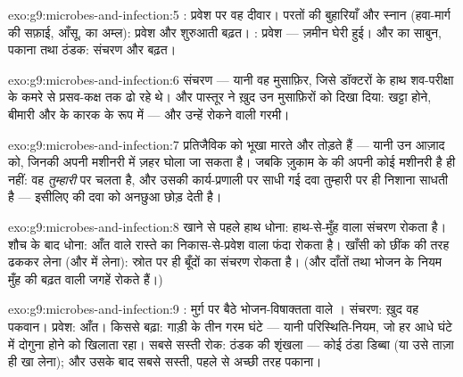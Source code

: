 \begin{solution}{exo:g9:microbes-and-infection:5}
: प्रवेश पर वह दीवार। परतों की बुहारियाँ और स्नान (हवा-मार्ग की
सफ़ाई, आँसू,  का अम्ल): प्रवेश और शुरुआती बढ़त। : प्रवेश --- ज़मीन घेरी हुई। और  का साबुन, पकाना तथा
ठंडक: संचरण और बढ़त।
\end{solution}

\begin{solution}{exo:g9:microbes-and-infection:6}
संचरण --- यानी वह मुसाफ़िर, जिसे डॉक्टरों के हाथ शव-परीक्षा के कमरे से
प्रसव-कक्ष तक ढो रहे थे। और पास्तूर ने ख़ुद उन मुसाफ़िरों को दिखा दिया:
खट्टा होने, बीमारी और  के कारक के रूप में  --- और
उन्हें रोकने वाली गरमी।
\end{solution}

\begin{solution}{exo:g9:microbes-and-infection:7}
प्रतिजैविक  को भूखा मारते और तोड़ते हैं --- यानी उन आज़ाद
 को, जिनकी अपनी मशीनरी में ज़हर घोला जा सकता है। जबकि ज़ुकाम के
 की अपनी कोई मशीनरी है ही नहीं: वह \emph{तुम्हारी} पर चलता है, और
उसकी कार्य-प्रणाली पर साधी गई दवा तुम्हारी  पर ही निशाना साधती
है --- इसीलिए  की दवा  को अनछुआ छोड़ देती है।
\end{solution}

\begin{solution}{exo:g9:microbes-and-infection:8}
खाने से पहले हाथ धोना: हाथ-से-मुँह वाला संचरण रोकता है। शौच के बाद धोना:
आँत वाले रास्ते का निकास-से-प्रवेश वाला फंदा रोकता है। खाँसी को छींक की
तरह ढककर लेना (और  में लेना): स्रोत पर ही बूँदों का संचरण रोकता
है। (और दाँतों तथा भोजन के नियम मुँह की बढ़त वाली जगहें रोकते हैं।)
\end{solution}

\begin{solution}{exo:g9:microbes-and-infection:9}
: मुर्ग़ पर बैठे भोजन-विषाक्तता वाले । संचरण: ख़ुद वह पकवान।
प्रवेश: आँत। किससे बढ़ा: गाड़ी के तीन गरम घंटे --- यानी परिस्थिति-नियम,
जो हर आधे घंटे में दोगुना होने को खिलाता रहा। सबसे सस्ती रोक: ठंडक की
शृंखला --- कोई ठंडा डिब्बा (या उसे ताज़ा ही खा लेना); और उसके बाद
सबसे सस्ती, पहले से अच्छी तरह पकाना।
\end{solution}

